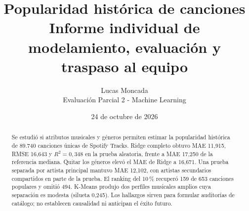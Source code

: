 \documentclass[11pt,a4paper]{article}
\title{\textbf{Popularidad histórica de canciones}\\[0.3em]
\large Informe individual de modelamiento, evaluación y traspaso al equipo}
\author{Lucas Moncada\\Evaluación Parcial 2 - Machine Learning}
\date{24 de octubre de 2026}
\begin{document}
\maketitle

\begin{center}
\end{center}

\begin{abstract}
Se estudió si atributos musicales y géneros permiten estimar la popularidad histórica
de 89.740 canciones únicas de Spotify Tracks. Ridge completo obtuvo MAE 11,915,
RMSE 16,643 y $R^2=0,348$ en la prueba aleatoria, frente a MAE 17,250 de la
referencia mediana. Quitar los géneros elevó el MAE de Ridge a 16,671. Una prueba
separada por artista principal mantuvo MAE 12,102, con artistas secundarios
compartidos en parte de la prueba. El ranking del 10\,\% recuperó 159 de 653
canciones populares y omitió 494. K-Means produjo dos perfiles musicales amplios
cuya separación es modesta (silueta 0,245). Los hallazgos sirven para formular
auditorías de catálogo; no establecen causalidad ni anticipan el éxito futuro.
\end{abstract}

\tableofcontents
\clearpage




\end{document}
